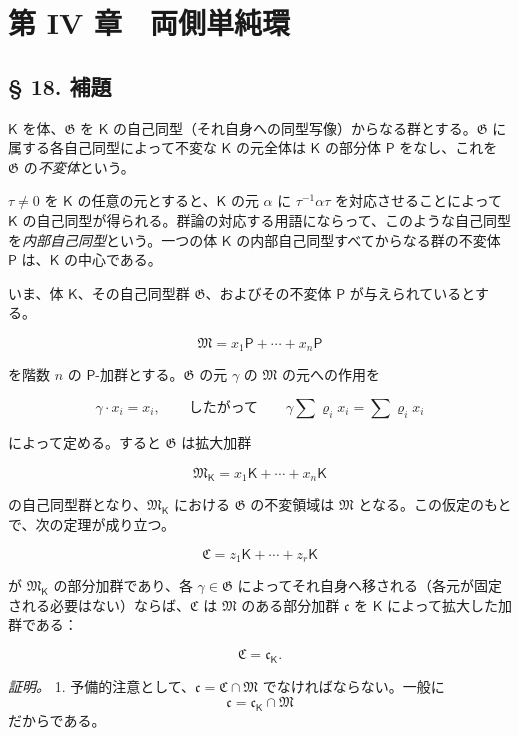 \section*{第 IV 章　両側単純環}\label{kapitel-iv.-zweiseitig-einfache-ringe}

\subsection*{§ 18. 補題}\label{ein-hilfssatz}

$\mathsf K$ を体、$\mathfrak G$ を $\mathsf K$ の自己同型（それ自身への同型写像）からなる群とする。$\mathfrak G$ に属する各自己同型によって不変な $\mathsf K$ の元全体は $\mathsf K$ の部分体 $\mathsf P$ をなし、これを $\mathfrak G$ の\emph{不変体}という。

$\tau\ne0$ を $\mathsf K$ の任意の元とすると、$\mathsf K$ の元 $\alpha$ に $\tau^{-1}\alpha\tau$ を対応させることによって $\mathsf K$ の自己同型が得られる。群論の対応する用語にならって、このような自己同型を\emph{内部自己同型}という。一つの体 $\mathsf K$ の内部自己同型すべてからなる群の不変体 $\mathsf P$ は、$\mathsf K$ の中心である。

いま、体 $\mathsf K$、その自己同型群 $\mathfrak G$、およびその不変体 $\mathsf P$ が与えられているとする。

\[
\mathfrak M=x_1\mathsf P+\cdots+x_n\mathsf P
\]

を階数 $n$ の $\mathsf P$-加群とする。$\mathfrak G$ の元 $\gamma$ の $\mathfrak M$ の元への作用を

\[
\gamma\cdot x_i=x_i,\qquad\text{したがって}\qquad
\gamma\sum \varrho_i x_i=\sum \varrho_i x_i
\]

によって定める。すると $\mathfrak G$ は拡大加群

\[
\mathfrak M_{\mathsf K}=x_1\mathsf K+\cdots+x_n\mathsf K
\]

の自己同型群となり、$\mathfrak M_{\mathsf K}$ における $\mathfrak G$ の不変領域は $\mathfrak M$ となる。この仮定のもとで、次の定理が成り立つ。

\begingroup\itshape
\[
\mathfrak C=z_1\mathsf K+\cdots+z_r\mathsf K
\]

が $\mathfrak M_{\mathsf K}$ の部分加群であり、各 $\gamma\in\mathfrak G$ によってそれ自身へ移される（各元が固定される必要はない）ならば、$\mathfrak C$ は $\mathfrak M$ のある部分加群 $\mathfrak c$ を $\mathsf K$ によって拡大した加群である：

\[
\mathfrak C=\mathfrak c_{\mathsf K}.
\]
\endgroup

\emph{証明。} 1. 予備的注意として、$\mathfrak c=\mathfrak C\cap\mathfrak M$ でなければならない。一般に
\[
\mathfrak c=\mathfrak c_{\mathsf K}\cap\mathfrak M
\]
だからである。

